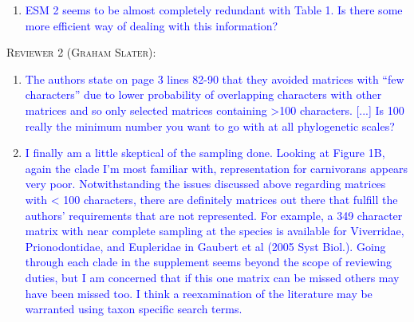 \documentclass[12pt,letterpaper]{article}
\renewcommand{\section}[1]{%
\bigskip
\begin{center}
\begin{Large}
\normalfont\scshape #1
\medskip
\end{Large}
\end{center}}
\begin{document}
\begin{enumerate}
\item{\textcolor{blue}{ESM 2 seems to be almost completely redundant with Table 1. Is there some more efficient way of dealing with this information?}}


\end{enumerate}


\section{Reviewer 2 (Graham Slater):} %
\begin{enumerate}
\item{\textcolor{blue}{The authors state on page 3 lines 82-90 that they avoided matrices with ``few characters'' due to lower probability of overlapping characters with other matrices and so only selected matrices containing >100 characters. [...] Is 100 really the minimum number you want to go with at all phylogenetic scales?}}


\item{\textcolor{blue}{I finally am a little skeptical of the sampling done. Looking at Figure 1B, again the clade I'm most familiar with, representation for carnivorans appears very poor. Notwithstanding the issues discussed above regarding matrices with < 100 characters, there are definitely matrices out there that fulfill the authors' requirements that are not represented. For example, a 349 character matrix with near complete sampling at the species is available for Viverridae, Prionodontidae, and Eupleridae in Gaubert et al (2005 Syst Biol.). Going through each clade in the supplement seems beyond the scope of reviewing duties, but I am concerned that if this one matrix can be missed others may have been missed too. I think a reexamination of the literature may be warranted using taxon specific search terms.}}



\end{enumerate}
\end{document}
